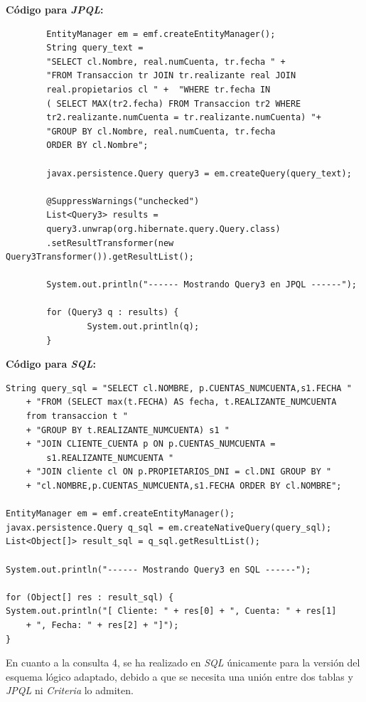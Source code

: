 \documentclass[11pt,a4paper]{article}
\begin{document}
\bigbreak
\textbf{Código para \textit{JPQL}:}

\begin{lstlisting}
        EntityManager em = emf.createEntityManager();
        String query_text = 
        "SELECT cl.Nombre, real.numCuenta, tr.fecha " +
        "FROM Transaccion tr JOIN tr.realizante real JOIN 
        real.propietarios cl " +  "WHERE tr.fecha IN 
        ( SELECT MAX(tr2.fecha) FROM Transaccion tr2 WHERE 
        tr2.realizante.numCuenta = tr.realizante.numCuenta) "+
        "GROUP BY cl.Nombre, real.numCuenta, tr.fecha 
        ORDER BY cl.Nombre";

        javax.persistence.Query query3 = em.createQuery(query_text);

        @SuppressWarnings("unchecked")
        List<Query3> results = 
        query3.unwrap(org.hibernate.query.Query.class)
        .setResultTransformer(new Query3Transformer()).getResultList();

        System.out.println("------ Mostrando Query3 en JPQL ------");

        for (Query3 q : results) {
                System.out.println(q);
        }
\end{lstlisting}


\bigbreak
\textbf{Código para \textit{SQL}:}
\begin{lstlisting}
String query_sql = "SELECT cl.NOMBRE, p.CUENTAS_NUMCUENTA,s1.FECHA "
	+ "FROM (SELECT max(t.FECHA) AS fecha, t.REALIZANTE_NUMCUENTA 
	from transaccion t "
	+ "GROUP BY t.REALIZANTE_NUMCUENTA) s1 "
	+ "JOIN CLIENTE_CUENTA p ON p.CUENTAS_NUMCUENTA = 
		s1.REALIZANTE_NUMCUENTA "
	+ "JOIN cliente cl ON p.PROPIETARIOS_DNI = cl.DNI GROUP BY "
	+ "cl.NOMBRE,p.CUENTAS_NUMCUENTA,s1.FECHA ORDER BY cl.NOMBRE";

EntityManager em = emf.createEntityManager();
javax.persistence.Query q_sql = em.createNativeQuery(query_sql);
List<Object[]> result_sql = q_sql.getResultList();

System.out.println("------ Mostrando Query3 en SQL ------");

for (Object[] res : result_sql) {
System.out.println("[ Cliente: " + res[0] + ", Cuenta: " + res[1] 
	+ ", Fecha: " + res[2] + "]");
}
\end{lstlisting}
\bigbreak
En cuanto a la consulta 4, se ha realizado en \textit{SQL} únicamente para la versión del esquema lógico adaptado, debido a que se necesita una unión entre dos tablas y \textit{JPQL} ni \textit{Criteria} lo admiten.
\end{document}
